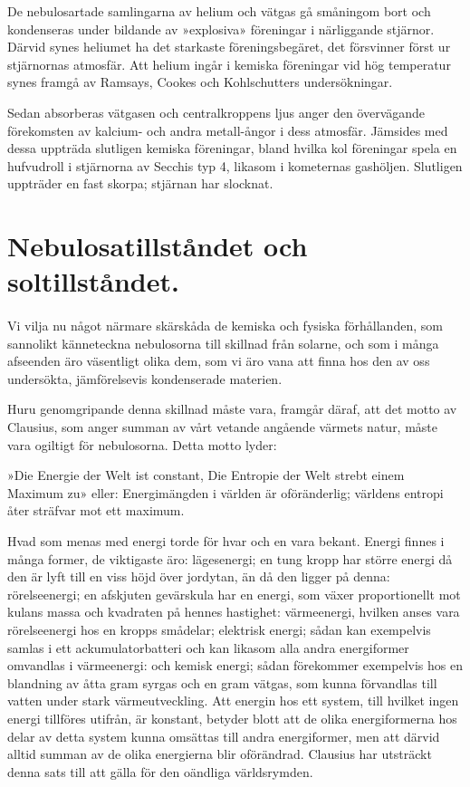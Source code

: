 \documentclass[a4paper, 12pt, oneside, swedish]{article}
\begin{document}
De nebulosartade samlingarna av helium och vätgas gå småningom bort och kondenseras under bildande av »explosiva» föreningar i närliggande stjärnor. Därvid synes heliumet ha det starkaste föreningsbegäret, det försvinner först ur stjärnornas atmosfär. Att helium ingår i kemiska föreningar vid hög temperatur synes framgå av Ramsays, Cookes och Kohlschutters undersökningar.

Sedan absorberas vätgasen och centralkroppens ljus anger den övervägande förekomsten av kalcium- och andra metall-ångor i dess atmosfär. Jämsides med dessa uppträda slutligen kemiska föreningar, bland hvilka kol föreningar spela en hufvudroll i stjärnorna av Secchis typ 4, likasom i kometernas gashöljen. Slutligen uppträder en fast skorpa; stjärnan har slocknat.
\clearpage
\section{Nebulosatillståndet och soltillståndet.}
\paragraph{}
Vi vilja nu något närmare skärskåda de kemiska och fysiska förhållanden, som sannolikt känneteckna nebulosorna till skillnad från solarne, och som i många afseenden äro väsentligt olika dem, som vi äro vana att finna hos den av oss undersökta, jämförelsevis kondenserade materien.

Huru genomgripande denna skillnad måste vara, framgår däraf, att det motto av Clausius, som anger summan av vårt vetande angående värmets natur, måste vara ogiltigt för nebulosorna. Detta motto lyder:

»Die Energie der Welt ist constant, Die Entropie der Welt strebt einem Maximum zu» eller: Energimängden i världen är oföränderlig; världens entropi åter sträfvar mot ett maximum.

Hvad som menas med energi torde för hvar och en vara bekant. Energi finnes i många former, de viktigaste äro: lägesenergi; en tung kropp har större energi då den är lyft till en viss höjd över jordytan, än då den ligger på denna: rörelseenergi; en afskjuten gevärskula har en energi, som växer proportionellt mot kulans massa och kvadraten på hennes hastighet: värmeenergi, hvilken anses vara rörelseenergi hos en kropps smådelar; elektrisk energi; sådan kan exempelvis samlas i ett ackumulatorbatteri och kan likasom alla andra energiformer omvandlas i värmeenergi: och kemisk energi; sådan förekommer exempelvis hos en blandning av åtta gram syrgas och en gram vätgas, som kunna förvandlas till vatten under stark värmeutveckling. Att energin hos ett system, till hvilket ingen energi tillföres utifrån, är konstant, betyder blott att de olika energiformerna hos delar av detta system kunna omsättas till andra energiformer, men att därvid alltid summan av de olika energierna blir oförändrad. Clausius har utsträckt denna sats till att gälla för den oändliga världsrymden.
\end{document}
